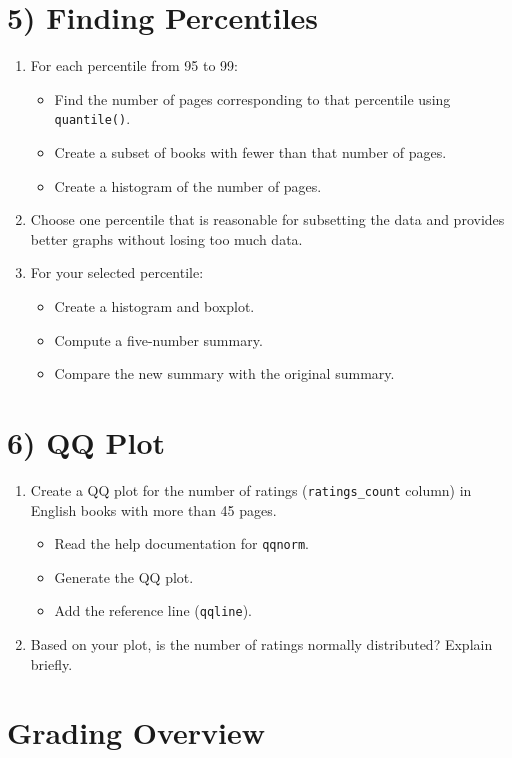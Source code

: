 \documentclass{article}
\begin{document}
\section*{5) Finding Percentiles}
\begin{enumerate}
    \item For each percentile from 95 to 99:
    \begin{itemize}
        \item Find the number of pages corresponding to that percentile using \texttt{quantile()}.
        \item Create a subset of books with fewer than that number of pages.
        \item Create a histogram of the number of pages.
    \end{itemize}
    \item Choose one percentile that is reasonable for subsetting the data and provides better graphs without losing too much data.
    \item For your selected percentile:
    \begin{itemize}
        \item Create a histogram and boxplot.
        \item Compute a five-number summary.
        \item Compare the new summary with the original summary.
    \end{itemize}
\end{enumerate}

\section*{6) QQ Plot}
\begin{enumerate}
    \item Create a QQ plot for the number of ratings (\texttt{ratings\_count} column) in English books with more than 45 pages.
    \begin{itemize}
        \item Read the help documentation for \texttt{qqnorm}.
        \item Generate the QQ plot.
        \item Add the reference line (\texttt{qqline}).
    \end{itemize}
    \item Based on your plot, is the number of ratings normally distributed? Explain briefly.
\end{enumerate}
\newpage
\section*{Grading Overview}
\end{document}
